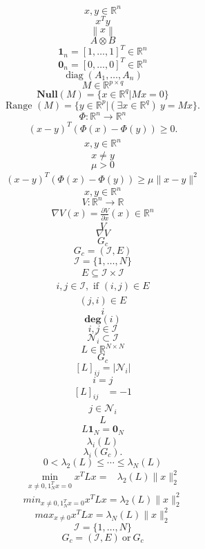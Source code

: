 \documentclass[11pt]{ctexart}
\begin{document}
$$x,y\in\mathbb{R}^n$$
$$x^{T}y$$
$$\left\|x\right\|$$
$$A\otimes B$$
$$\mathbf{1}_n=[1,\ldots,1]^T\in\mathbb{R}^n$$
$$\mathbf{0}_n=[0,\ldots,0]^T\in\mathbb{R}^n$$
$$\operatorname{diag}(A_1,\ldots,A_n)$$
$$M\in\mathbb{R}^{p\times q}$$
$$\mathbf{Null}(M)=\{x\in\mathbb{R}^{q}|Mx=0\}$$
$$\text{Range }(M)=\{y\in\mathbb{R}^p|(\exists x\in\mathbb{R}^q)~y=Mx\}.$$
$$\Phi:\mathbb{R}^n\to\mathbb{R}^n$$
$$\begin{aligned}(x-y)^T(\Phi(x)-\Phi(y))\geq0.\end{aligned}$$
$$\begin{aligned}x,y\in\mathbb{R}^n\end{aligned}$$
$$x\neq y$$
$$\mu>0$$
$$\begin{aligned}(x-y)^T\left(\Phi(x)-\Phi(y)\right)\geq\mu\|x-y\|^2\end{aligned}$$
$$x,y\in\mathbb{R}^n$$
$$V:\mathbb{R}^n\to\mathbb{R}$$
$$\begin{aligned}\nabla V(x)=\frac{\partial V}{\partial x}(x)\in\mathbb{R}^n\end{aligned}$$
$$V$$
$$\nabla V$$
$$G_{c}$$
$$G_{c}=(\mathcal{I},E)$$
$$\mathcal{I}=\{1,\ldots,N\}$$
$$\begin{aligned}E\subseteq\mathcal{I}\times\mathcal{I}\end{aligned}$$
$$\begin{aligned}i,j\in\mathcal{I},\text{ if }(i,j)\in E\end{aligned}$$
$$\begin{aligned}(j,i)\in E\end{aligned}$$
$$i$$
$$\mathbf{deg}(i)$$
$$i,j\in\mathcal{I}$$
$$\mathcal{N}_{i}\subset\mathcal{I}$$
$$L\in\mathbb{R}^{N\times N}$$
$$G_{c}$$
$$[L]_{ij}=|\mathcal{N}_i|$$
$$i=j$$
$$\begin{aligned}[L]_{ij}&=-1\end{aligned}$$
$$\begin{aligned}j\in\mathcal{N}_i\end{aligned}$$
$$L$$
$$\begin{aligned}L\mathbf{1}_N=\mathbf{0}_N\end{aligned}$$
$$\lambda_{i}\left(L\right)$$
$$\lambda_i\left(G_c\right).$$
$$0<\lambda_2\left(L\right)\leq\cdots\leq\lambda_N\left(L\right)$$
$$\begin{aligned}\min_{x\ne0,1_N^Tx=0}x^TLx=&\lambda_2(L)\|x\|_2^2\end{aligned}$$
$$min_{x\neq0,1_N^Tx=0}x^T Lx=\lambda_2(L)\|x\|_2^2$$
$$max_{x\neq0}x^T Lx=\lambda_N(L)\|x\|_2^2$$
$$\mathcal{I}=\{1,\ldots,N\}$$
$$G_{c}=(\mathcal{I},E)\mathrm{~or~}G_{c}$$
\end{document}

